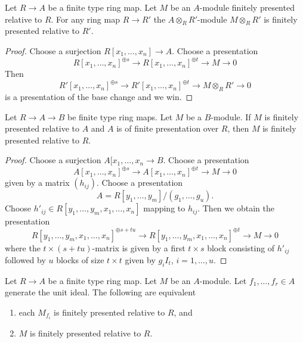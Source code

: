 \begin{lemma}
\label{lemma-base-change-relative-finite-presentation}
Let $R \to A$ be a finite type ring map. Let $M$ be an $A$-module finitely
presented relative to $R$. For any ring map $R \to R'$ the
$A \otimes_R R'$-module $M \otimes_R R'$ is finitely presented relative
to $R'$.
\end{lemma}

\begin{proof}
Choose a surjection $R[x_1, \ldots, x_n] \to A$. Choose a presentation
$$
R[x_1, \ldots, x_n]^{\oplus s} \to
R[x_1, \ldots, x_n]^{\oplus t} \to M \to 0
$$
Then
$$
R'[x_1, \ldots, x_n]^{\oplus s} \to
R'[x_1, \ldots, x_n]^{\oplus t} \to M \otimes_R R' \to 0
$$
is a presentation of the base change and we win.
\end{proof}

\begin{lemma}
\label{lemma-composition-relative-finite-presentation}
Let $R \to A \to B$ be finite type ring maps. Let $M$ be a $B$-module.
If $M$ is finitely presented relative to $A$ and $A$ is of finite presentation
over $R$, then $M$ is finitely presented relative to $R$.
\end{lemma}

\begin{proof}
Choose a surjection $A[x_1, \ldots, x_n \to B$.
Choose a presentation
$$
A[x_1, \ldots, x_n]^{\oplus s} \to
A[x_1, \ldots, x_n]^{\oplus t} \to M \to 0
$$
given by a matrix $(h_{ij})$. Choose a presentation
$$
A = R[y_1, \ldots, y_m]/(g_1, \ldots, g_u).
$$
Choose $h'_{ij} \in R[y_1, \ldots, y_m, x_1, \ldots, x_n]$
mapping to $h_{ij}$. Then we obtain the presentation
$$
R[y_1, \ldots, y_m, x_1, \ldots, x_n]^{\oplus s + tu} \to
R[y_1, \ldots, y_m, x_1, \ldots, x_n]^{\oplus t} \to M \to 0
$$
where the $t \times (s + tu)$-matrix is given by a first $t \times s$ block
consisting of $h'_{ij}$ followed by $u$ blocks of size $t \times t$ given
by $g_iI_t$, $i = 1, \ldots, u$.
\end{proof}

\begin{lemma}
\label{lemma-glue-relative-finite-presentation}
Let $R \to A$ be a finite type ring map. Let $M$ be an $A$-module.
Let $f_1, \ldots, f_r \in A$ generate the unit ideal.
The following are equivalent
\begin{enumerate}
\item each $M_{f_i}$ is finitely presented relative to $R$, and
\item $M$ is finitely presented relative to $R$.
\end{enumerate}
\end{lemma}

